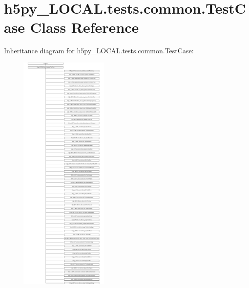 \hypertarget{classh5py__LOCAL_1_1tests_1_1common_1_1TestCase}{}\section{h5py\+\_\+\+L\+O\+C\+A\+L.\+tests.\+common.\+Test\+Case Class Reference}
\label{classh5py__LOCAL_1_1tests_1_1common_1_1TestCase}
Inheritance diagram for h5py\+\_\+\+L\+O\+C\+A\+L.\+tests.\+common.\+Test\+Case\+:\begin{figure}[H]
\begin{center}
\leavevmode
\includegraphics[height=12.000000cm]{classh5py__LOCAL_1_1tests_1_1common_1_1TestCase}
\end{center}
\end{figure}

